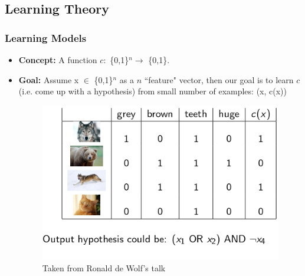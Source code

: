 \documentclass{beamer}
\begin{document}
\subsection{Learning Theory}
\begin{frame}\frametitle{Learning Models}
\begin{itemize}
\item \textbf{Concept:} A function $c:$ \{0,1\}$^{n} \rightarrow$ \{0,1\}.
\item \textbf{Goal:} Assume x $\in$ \{0,1\}$^{n}$ as a $n$ ``feature" vector, then our goal is to learn $c$ (i.e. come up with a hypothesis) from small number
 of examples: (x, c(x))

\begin{figure}
\includegraphics[scale=.9]{eg} 
\caption{Taken from Ronald de Wolf's talk}
\end{figure}

\end{itemize}
\end{frame}
\end{document}
